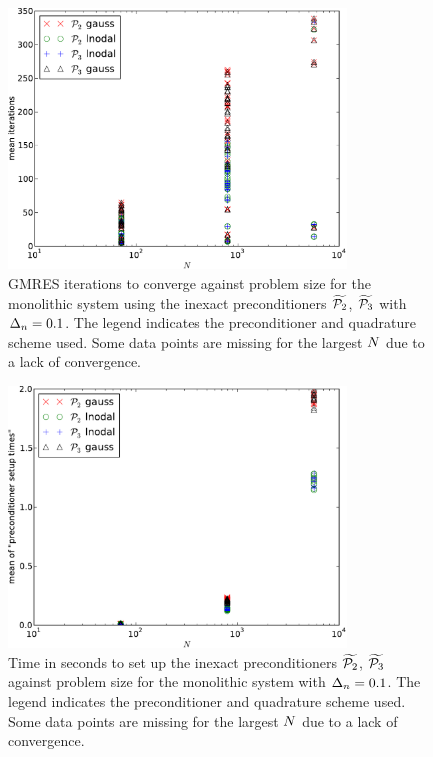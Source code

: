 \begin{figure}
  \centering
  \includegraphics[width=0.8\textwidth]{plots/linear_solvers_p2p3/implicitilu-1-meanofnsolveritersvsinitialnnode.pdf}
  \caption{GMRES iterations to converge against problem size for the monolithic system using the inexact preconditioners $\widetilde{\mathcal{P}_2}$, $\widetilde{\mathcal{P}_3}$ with $\Delta_{n}=0.1$.
    The legend indicates the preconditioner and quadrature scheme used.
    Some data points are missing for the largest $N$ due to a lack of convergence.
  }
  \label{fig:its-p23-ilu1}
\end{figure}

\begin{figure}
  \centering
  \includegraphics[width=0.8\textwidth]{plots/linear_solvers_p2p3/implicitilu-1-meanofpreconditionersetuptimesvsinitialnnode.pdf}
  \caption{
    Time in seconds to set up the inexact preconditioners $\widetilde{\mathcal{P}_2}$, $\widetilde{\mathcal{P}_3}$ against problem size for the monolithic system with $\Delta_{n}=0.1$.
    The legend indicates the preconditioner and quadrature scheme used.
    Some data points are missing for the largest $N$ due to a lack of convergence.}
  \label{fig:times-p23-ilu1}
\end{figure}

